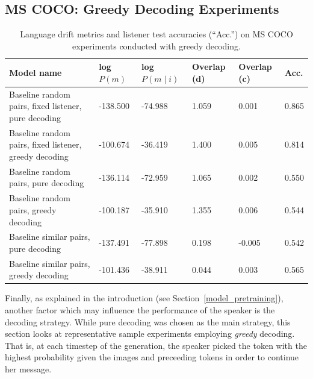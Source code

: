 \subsection{MS COCO: Greedy Decoding Experiments}
\label{expt:coco_greedy}
\begin{table}[]
	\begin{tabularx}{\linewidth}{|X|l|l|X|X|X|}
		\hline
			\textbf{Model name}                                    & \textbf{log $P(m)$} & \textbf{log $P(m \mid i)$} & \textbf{Overlap (d)} & \textbf{Overlap (c)} & \textbf{Acc. }  \\ \hline
			 Baseline random pairs, fixed listener, pure decoding   &     -138.500         &         -74.988               &       1.059            &      0.001               &       0.865       \\ \hline
			 Baseline random pairs, fixed listener, greedy decoding   &     -100.674     &         -36.419              &       1.400       &      0.005             &       0.814         \\ \hline
			 Baseline random pairs, pure decoding   & -136.114        &      -72.959            &       1.065          &      0.002               &       0.550       \\ \hline
			 Baseline random pairs, greedy decoding   &-100.187      &    -35.910            &       1.355          &      0.006            &       0.544       \\ \hline
			 Baseline similar pairs, pure decoding   &     -137.491& -77.898    & 0.198    &   -0.005    &  0.542        \\ \hline
			 Baseline similar pairs, greedy decoding   &   -101.436  &      -38.911        &     0.044   &     0.003     &  0.565           \\ \hline
			 
	\end{tabularx}
\caption{\label{tab:coco_greedy}Language drift metrics and listener test accuracies (``Acc.'') on MS COCO experiments conducted with greedy decoding.}
\end{table}

Finally, as explained in the introduction (see Section~\ref{model_pretraining}), another factor which may influence the performance of the speaker is the decoding strategy. While pure decoding was chosen as the main strategy, this section looks at representative sample experiments employing \emph{greedy} decoding. That is, at each timestep of the generation, the speaker picked the token with the highest probability given the images and preceeding tokens in order to continue her message. 

